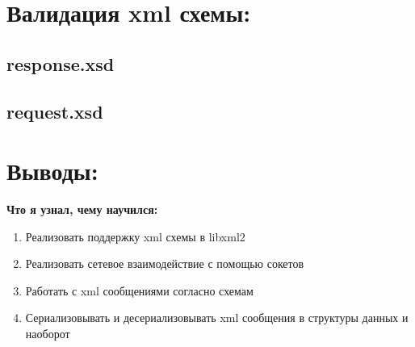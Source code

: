 \documentclass[12pt,onecolumn]{article}
\begin{document}
\section{Валидация xml схемы:}
\subsection{response.xsd}


\subsection{request.xsd}


\section{Выводы:}

\textbf{Что я узнал, чему научился:}
\begin{enumerate}
    \item Реализовать поддержку xml схемы в libxml2
    \item Реализовать сетевое взаимодействие с помощью сокетов
    \item Работать с xml сообщениями согласно схемам
    \item Сериализовывать и десериализовывать xml сообщения в структуры данных и наоборот
\end{enumerate}
\end{document}
